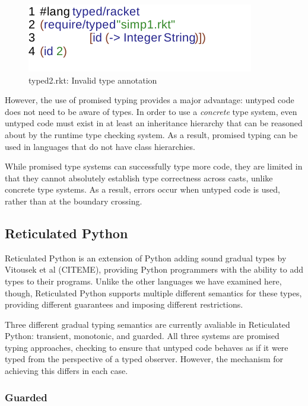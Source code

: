 \documentclass[preprint]{sigplanconf}
\begin{document}
\begin{figure}[h]
\includegraphics{typed-rkt2.pdf}
\caption{typed2.rkt: Invalid type annotation}
\label{fig:tr2}
\end{figure}

However, the use of promised typing provides a major advantage: untyped code does not 
need to be aware of types. In order to use a \emph{concrete} type system, even untyped
code must exist in at least an inheritance hierarchy that can be reasoned about by the 
runtime type checking system. As a result, promised typing can be used in languages that
do not have class hierarchies. 

While promised type systems can successfully type more code, they are limited in that
they cannot absolutely establish type correctness across casts, unlike concrete type
systems. As a result, errors occur when untyped code is used, rather than at the boundary
crossing.

\subsection{Reticulated Python}

Reticulated Python is an extension of Python adding sound gradual types by 
Vitousek et al (CITEME), providing Python programmers with the ability to add types
to their programs. Unlike the other languages we have examined here, though, Reticulated
Python supports multiple different semantics for these types, providing different guarantees
and imposing different restrictions.

Three different gradual typing semantics are currently avaliable in Reticulated Python:
transient, monotonic, and guarded. All three systems are promised typing approaches,
checking to ensure that untyped code behaves as if it were typed from the perspective
of a typed observer. However, the mechanism for achieving this differs in each case.

\subsubsection{Guarded}
\end{document}

